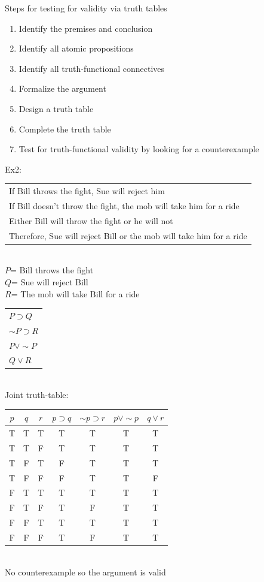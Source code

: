 \documentclass[11pt, fleqn]{article}
\begin{document}
Steps for testing for validity via truth tables
\begin{enumerate}
    \item Identify the premises and conclusion
    \item Identify all atomic propositions
    \item Identify all truth-functional connectives
    \item Formalize the argument
    \item Design a truth table
    \item Complete the truth table
    \item Test for truth-functional validity by looking for a counterexample
\end{enumerate}
Ex2:\\
\begin{tabular}{p{11cm}}
    If Bill throws the fight, Sue will reject him\\
    If Bill doesn't throw the fight, the mob will take him for a ride\\
    Either Bill will throw the fight or he will not\\
    \hline
    Therefore, Sue will reject Bill or the mob will take him for a ride
\end{tabular}\\
$P$= Bill throws the fight\\
$Q$= Sue will reject Bill\\
$R$= The mob will take Bill for a ride\\
\begin{tabular}{p{2cm}}
    $P\supset Q$\\
    $\sim P\supset R$\\
    $P\vee \sim P$\\
    \hline
    $Q\vee R$
\end{tabular}\\
Joint truth-table:\\
\begin{tabular}{c|c|c||c|c|c||c}
    $p$ & $q$ & $r$ & $p\supset q$ & $\sim p\supset r$ & $p\vee \sim p$ & $q \vee r$\\
    \hline
    T & T & T & T & T & T & T\\
    T & T & F & T & T & T & T\\
    T & F & T & F & T & T & T\\
    T & F & F & F & T & T & F\\
    F & T & T & T & T & T & T\\
    F & T & F & T & F & T & T\\
    F & F & T & T & T & T & T\\
    F & F & F & T & F & T & T
\end{tabular}\\
No counterexample so the argument is valid\\
\end{document}
